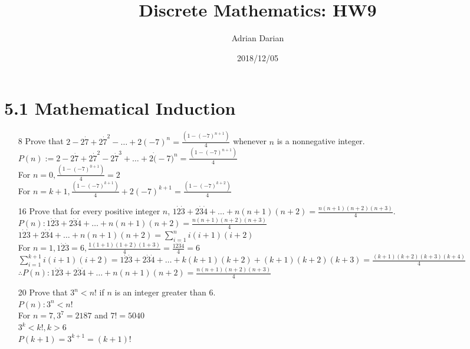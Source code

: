 \documentclass[a4paper]{article}
\title{Discrete Mathematics: HW9}
\author{Adrian Darian}
\date{2018/12/05}
\newcommand\tab[1][0.5cm]{\hspace*{#1}}
\begin{document}
  
  \maketitle

  \section*{5.1 Mathematical Induction}
  \begin{itemize}
    \item[8] Prove that $2 - 2 \dot 7 + 2 \dot 7^{2} - \dots + 2(-7)^{n} = \frac{(1 - (-7)^{n + 1})}{4}$ whenever $n$ is a nonnegative integer. \\
    \tab $P(n) := 2 - 2 \dot 7 + 2 \dot 7^{2} - 2 \dot 7^{3} + \dots + 2 \dot (-7)^{n} = \frac{(1 - (-7)^{n + 1})}{4}$ \\
    \tab For $n = 0, \frac{(1 - (-7)^{0 + 1})}{4} = 2$ \\
    \tab For $n = k + 1, \frac{(1 - (-7)^{k + 1})}{4} + 2(-7)^{k + 1} = \frac{(1 - (-7)^{k + 2})}{4}$
    \item[16] Prove that for every positive integer $n$, $1 \dot 2 \dot 3 + 2 \dot 3 \dot 4 + \dots + n(n + 1)(n + 2) = \frac{n(n + 1)(n + 2)(n + 3)}{4}$. \\
    \tab $P(n): 1 \dot 2 \dot 3 + 2 \dot 3 \dot 4 + \dots + n(n + 1)(n + 2) = \frac{n(n + 1)(n + 2)(n + 3)}{4}$ \\
    \tab $1 \dot 2 \dot 3 + 2 \dot 3 \dot 4 + \dots + n(n + 1)(n + 2) = \sum_{i = 1}^{n} i(i + 1)(i + 2)$ \\
    \tab For $n = 1, 1 \dot 2 \dot 3 = 6, \frac{1(1 + 1)(1 + 2)(1 + 3)}{4} = \frac{1 \dot 2 \dot 3 \dot 4}{4} = 6$ \\
    \tab $\sum_{i = 1}^{k + 1} i(i + 1)(i + 2) = 1 \dot 2 \dot 3 + 2 \dot 3 \dot 4 + \dots + k(k + 1)(k + 2) + (k + 1)(k + 2)(k + 3) = \frac{(k + 1)(k + 2)(k + 3)(k + 4)}{4}$ \\
    \tab $\therefore P(n): 1 \dot 2 \dot 3 + 2 \dot 3 \dot 4 + \dots + n(n + 1)(n + 2) = \frac{n(n + 1)(n + 2)(n + 3)}{4}$
    \item[20] Prove that $3^{n} < n!$ if $n$ is an integer greater than $6$. \\
    \tab $P(n): 3^{n} < n!$ \\
    \tab For $n = 7, 3^{7} = 2187$ and $7! = 5040$ \\
    \tab $3^{k} < k!, k > 6$ \\
    \tab $P(k + 1) = 3^{k + 1} = (k + 1)!$
  \end{itemize}
\end{document}
